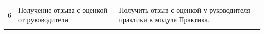 \begin{longtable}{|c|p{5.5cm}|p{8.5cm}|}
	6          & Получение отзыва с оценкой от руководителя &
	Получить отзыв с оценкой у руководителя практики в модуле Практика.                                                                                                                                                                                                                                                                                                                                                                                                                                                                                                                                                                                                                                                                                                                                                                                                                                                    \\ \hhline{|-|-|-|}
\end{longtable}
